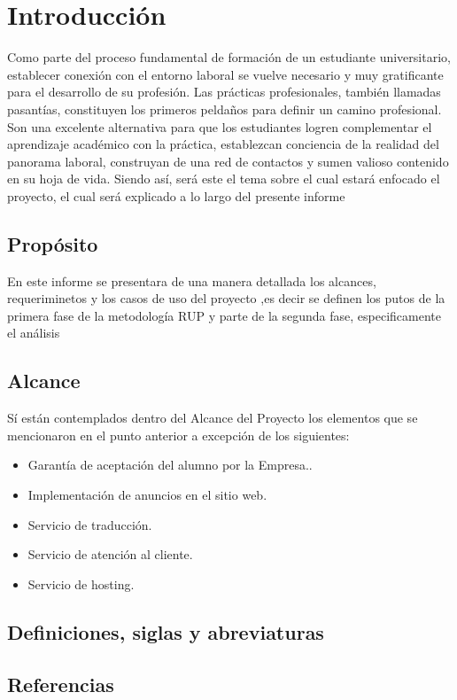 \chapter{Introducción}
Como parte del proceso fundamental de formación de un estudiante universitario, establecer conexión con el entorno laboral se vuelve necesario y muy gratificante para el desarrollo de su profesión.
Las prácticas profesionales, también llamadas pasantías, constituyen los primeros peldaños para definir un camino profesional. Son una excelente alternativa para que los estudiantes logren complementar el aprendizaje académico con la práctica, establezcan conciencia de la realidad del panorama laboral, construyan de una red de contactos y sumen valioso contenido en su hoja de vida.
Siendo así, será este el tema sobre el cual estará enfocado el proyecto, el cual será explicado a lo largo del presente informe
\section{Propósito}
En este informe se presentara de una manera detallada los alcances, requeriminetos y los casos de uso del proyecto ,es decir se definen los putos de la primera fase de la metodología RUP y parte de la segunda fase, especificamente el análisis
\section{Alcance}
Sí están contemplados dentro del Alcance del Proyecto los elementos que se mencionaron en el punto anterior a excepción de los siguientes:
\begin{itemize}
	\item Garantía de aceptación del alumno por la Empresa..
	\item Implementación de anuncios en el sitio web.
	\item Servicio de traducción.
	\item Servicio de atención al cliente.
	\item Servicio de hosting.
\end{itemize}

\section{Definiciones, siglas y abreviaturas}

\section{Referencias}